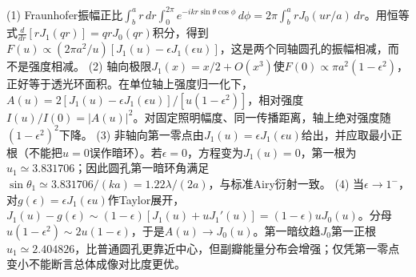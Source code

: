 (1) Fraunhofer振幅正比\(\int_b^a r\,dr\int_0^{2\pi}e^{-ikr\sin\theta\cos\phi}\,d\phi=2\pi\int_b^a rJ_0(ur/a)\,dr\)。用恒等式\(\frac{d}{dr}[rJ_1(qr)]=qrJ_0(qr)\)积分，得到\(F(u)\propto (2\pi a^2/u)[J_1(u)-\epsilon J_1(\epsilon u)]\)，这是两个同轴圆孔的振幅相减，而不是强度相减。
(2) 轴向极限\(J_1(x)=x/2+O(x^3)\)使\(F(0)\propto\pi a^2(1-\epsilon^2)\)，正好等于透光环面积。在单位轴上强度归一化下，\(A(u)=2[J_1(u)-\epsilon J_1(\epsilon u)]/[u(1-\epsilon^2)]\)，相对强度\(I(u)/I(0)=|A(u)|^2\)。对固定照明幅度、同一传播距离，轴上绝对强度随\((1-\epsilon^2)^2\)下降。
(3) 非轴向第一零点由\(J_1(u)=\epsilon J_1(\epsilon u)\)给出，并应取最小正根（不能把\(u=0\)误作暗环）。若\(\epsilon=0\)，方程变为\(J_1(u)=0\)，第一根为\(u_1\simeq3.831706\)；因此圆孔第一暗环角满足\(\sin\theta_1\simeq3.831706/(ka)=1.22\lambda/(2a)\)，与标准Airy衍射一致。
(4) 当\(\epsilon\to1^-\)，对\(g(\epsilon)=\epsilon J_1(\epsilon u)\)作Taylor展开，\(J_1(u)-g(\epsilon)\sim(1-\epsilon)[J_1(u)+uJ_1'(u)]=(1-\epsilon)uJ_0(u)\)。分母\(u(1-\epsilon^2)\sim2u(1-\epsilon)\)，于是\(A(u)\to J_0(u)\)。第一暗纹趋\(J_0\)第一正根\(u_1\simeq2.404826\)，比普通圆孔更靠近中心，但副瓣能量分布会增强；仅凭第一零点变小不能断言总体成像对比度更优。
